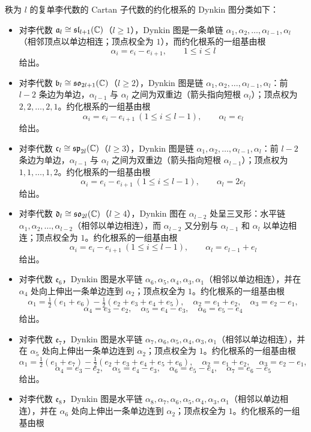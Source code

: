 \begin{theorem}[A.16] 秩为 $l$ 的复单李代数的 Cartan 子代数的约化根系的 Dynkin 图分类如下：
\begin{itemize}
\item 对李代数 $\mathfrak{a}_l\cong\mathfrak{sl}_{l+1}(\mathbb{C})$（$l\ge1$），Dynkin 图是一条单链 $\alpha_1,\alpha_2,\dots,\alpha_{l-1},\alpha_l$（相邻顶点以单边相连；顶点权全为 $1$），而约化根系的一组基由根
\[
\alpha_i=e_i-e_{i+1},\qquad 1\le i\le l
\]
给出。
\item 对李代数 $\mathfrak{b}_l\cong\mathfrak{so}_{2l+1}(\mathbb{C})$（$l\ge2$），Dynkin 图是链 $\alpha_1,\alpha_2,\dots,\alpha_{l-1},\alpha_l$：前 $l-2$ 条边为单边，$\alpha_{l-1}$ 与 $\alpha_l$ 之间为双重边（箭头指向短根 $\alpha_l$）；顶点权为 $2,2,\dots,2,1$。约化根系的一组基由根
\[
\alpha_i=e_i-e_{i+1}\ (1\le i\le l-1),\qquad \alpha_l=e_l
\]
给出。
\item 对李代数 $\mathfrak{c}_l\cong\mathfrak{sp}_{2l}(\mathbb{C})$（$l\ge3$），Dynkin 图是链 $\alpha_1,\alpha_2,\dots,\alpha_{l-1},\alpha_l$：前 $l-2$ 条边为单边，$\alpha_{l-1}$ 与 $\alpha_l$ 之间为双重边（箭头指向短根 $\alpha_{l-1}$）；顶点权为 $1,1,\dots,1,2$。约化根系的一组基由根
\[
\alpha_i=e_i-e_{i+1}\ (1\le i\le l-1),\qquad \alpha_l=2e_l
\]
给出。
\item 对李代数 $\mathfrak{d}_l\cong\mathfrak{so}_{2l}(\mathbb{C})$（$l\ge4$），Dynkin 图在 $\alpha_{l-2}$ 处呈三叉形：水平链 $\alpha_1,\alpha_2,\dots,\alpha_{l-2}$（相邻以单边相连），而 $\alpha_{l-2}$ 又分别与 $\alpha_{l-1}$ 和 $\alpha_l$ 以单边相连；顶点权全为 $1$。约化根系的一组基由根
\[
\alpha_i=e_i-e_{i+1}\ (1\le i\le l-1),\qquad \alpha_l=e_{l-1}+e_l
\]
给出。
\item 对李代数 $\mathfrak{e}_6$，Dynkin 图是水平链 $\alpha_6,\alpha_5,\alpha_4,\alpha_3,\alpha_1$（相邻以单边相连），并在 $\alpha_4$ 处向上伸出一条单边连到 $\alpha_2$；顶点权全为 $1$。约化根系的一组基由根
\[
\alpha_1=\tfrac12(e_1+e_6)-\tfrac12(e_2+e_3+e_4+e_5),\quad \alpha_2=e_1+e_2,\quad \alpha_3=e_2-e_1,
\]
\[
\alpha_4=e_3-e_2,\quad \alpha_5=e_4-e_3,\quad \alpha_6=e_5-e_4
\]
给出。
\item 对李代数 $\mathfrak{e}_7$，Dynkin 图是水平链 $\alpha_7,\alpha_6,\alpha_5,\alpha_4,\alpha_3,\alpha_1$（相邻以单边相连），并在 $\alpha_5$ 处向上伸出一条单边连到 $\alpha_2$；顶点权全为 $1$。约化根系的一组基由根
\[
\alpha_1=\tfrac12(e_1+e_7)-\tfrac12(e_2+e_3+e_4+e_5+e_6),\quad \alpha_2=e_1+e_2,\quad \alpha_3=e_2-e_1,
\]
\[
\alpha_4=e_3-e_2,\quad \alpha_5=e_4-e_3,\quad \alpha_6=e_5-e_4,\quad \alpha_7=e_6-e_5
\]
给出。
\item 对李代数 $\mathfrak{e}_8$，Dynkin 图是水平链 $\alpha_8,\alpha_7,\alpha_6,\alpha_5,\alpha_4,\alpha_3,\alpha_1$（相邻以单边相连），并在 $\alpha_6$ 处向上伸出一条单边连到 $\alpha_2$；顶点权全为 $1$。约化根系的一组基由根

\end{itemize}
\end{theorem}
